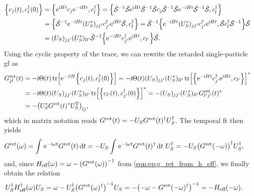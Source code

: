 \begin{align*}
\klc*{c_j(t), c_l^\dagger(0)} &= \klc*{ \powe{\i Ht} c_j \powe{-\i Ht}, c_l^\dagger} = \klc*{\chs^{-1} \chs \powe{\i Ht} \chs^{-1} \chs c_j \chs^{-1} \chs \powe{-\i Ht} \chs^{-1} \chs, c_l^\dagger} \\
&= \klc*{\chs^{-1} \powe{-\i Ht} \kla{U_S^\ast}_{jj'} c_{j'}^\dagger \powe{\i Ht} \chs, c_l^\dagger} = \chs^{-1} \klc*{\powe{-\i Ht} \kla{U_S^\ast}_{jj'} c_{j'}^\dagger \powe{\i Ht}, \chs c_l^\dagger \chs^{-1}} \chs\\
&= \kla{U_S}_{jj'} \kla{U_S^\ast}_{ll'} \chs^{-1} \klc*{\powe{-\i Ht} c_{j'}^\dagger \powe{\i Ht}, c_{l'}} \chs.
\end{align*}
Using the cyclic property of the trace, we can rewrite the retarded single-particle \gls{gf} as
\begin{align*}
G^\ret_{jl}(t) &= -\i\Theta(t) \tr \klb*{\powe{-\beta H} \klc*{c_j(t), c_l^\dagger(0)}} = -\i\Theta(t) \kla{U_S}_{jj'} \kla{U_S^\ast}_{ll'} \tr \klb*{\klc*{\powe{-\i Ht} c_{j'}^\dagger \powe{\i Ht}, c_{l'}}}^\ast\\
&= -\i\Theta(t) \kla{U_S}_{jj'} \kla{U_S^\ast}_{ll'} \tr \klb*{\klc*{c_{l'}(t), c_{j'}^\dagger(0)}}^\ast = -\kla{U_S}_{jj'} \kla{U_S^\ast}_{ll'} G^\ret_{l'j'}(t)^\ast \\
&= -\kla*{U_S^\ast G^\ret(t)^\ast U_S^\transpose}_{lj},
\end{align*}
which in matrix notation reads $G^\ret(t) = - U_S G^\ret(t)^\dagger U_S^\dagger$.
The temporal \gls{ft} then yields
\begin{align*}
G^\ret(\omega) &= \intx{ }{ }{\powe{-\i\omega t} G^\ret(t)}{t} = - U_S \intx{ }{ }{\powe{-\i\omega t} G^\ret(t)^\dagger }{t}\ U_S^\dagger = - U_S \kla*{G^\ret(-\omega)}^\dagger U_S^\dagger,
\end{align*}
and, since $H_\eff(\omega) = \omega - \kla*{G^\ret(\omega)}^{-1}$ from \autoref{eqn:ep:g_ret_from_h_eff}, we finally obtain the relation
\begin{align}
U_S^\dagger H_\eff^\dagger(\omega) U_S &= \omega - U_S^\dagger \kla*{G^\ret(\omega)^\dagger}^{-1} U_S = - \kla*{-\omega - G^\ret(-\omega)^\dagger}^{-1} = -H_\eff(-\omega). \label{eqn:app:H_eff_chiral_symmetry}
\end{align}
